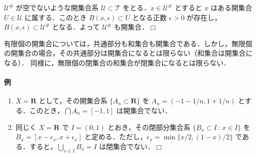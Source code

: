\documentclass[10pt,b5paper,pandoc]{bxjsarticle}
\providecommand{\tightlist}{%
  \setlength{\itemsep}{0pt}\setlength{\parskip}{0pt}}
\let\oldparagraph\paragraph
\renewcommand{\paragraph}[1]{\oldparagraph{#1}\mbox{}}
\begin{document}
\(\mathscr U^\#\) が空でないような開集合系
\(\mathscr U \subset \mathscr T\) をとる．\(x \in \mathscr U^\#\)
とすると \(x\) はある開集合 \(U \in \mathscr U\) に属する．このとき
\(B(x, \epsilon) \subset U\) となる正数 \(\epsilon > 0\)
が存在し，\(B(x, \epsilon) \subset \mathscr U^\#\) となる．よって
\(\mathscr U^\#\) も開集合．\(\Box\)

有限個の開集合については，共通部分も和集合も開集合である．しかし，無限個の開集合の場合，その共通部分は開集合になるとは限らない（和集合は開集合になる）．
同様に，無限個の閉集合の和集合が閉集合になるとは限らない．

\hypertarget{ux4f8b-2}{%
\paragraph{例}\label{ux4f8b-2}}

\begin{enumerate}
\def\labelenumi{\roman{enumi})}
\tightlist
\item
  \(X = \boldsymbol{R}\) として，その開集合系
  \(\{ A_n \subset \boldsymbol{R} \}\) を \(A_n = (-1 - 1/n, 1 + 1/n)\)
  とする．このとき，\(\bigcap A_n = [-1, 1]\) は開集合でない．
\item
  同じく \(X = \boldsymbol{R}\) で \(I = (0, 1)\)
  とおき，その閉部分集合系 \(\{ B_x \subset I \,:\,x \in I \}\) を
  \(B_x = [x - \epsilon_x , x + \epsilon_x]\)
  と定める．ただし，\(\epsilon_x = \min \{ x/2, (1-x)/2 \}\)
  である．すると，\(\bigcup_{x \in I} B_x = I\) は閉集合でない．\(\Box\)
\end{enumerate}
\end{document}
